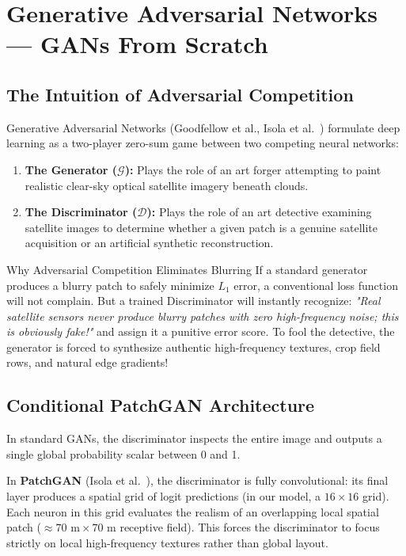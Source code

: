 \chapter{Generative Adversarial Networks --- GANs From Scratch}
\label{chap:ch13}

\section{The Intuition of Adversarial Competition}
Generative Adversarial Networks (Goodfellow et al., Isola et al.~\cite{isola2017pix2pix}) formulate deep learning as a two-player zero-sum game between two competing neural networks:
\begin{enumerate}
    \item \textbf{The Generator ($\mathcal{G}$):} Plays the role of an art forger attempting to paint realistic clear-sky optical satellite imagery beneath clouds.
    \item \textbf{The Discriminator ($\mathcal{D}$):} Plays the role of an art detective examining satellite images to determine whether a given patch is a genuine satellite acquisition or an artificial synthetic reconstruction.
\end{enumerate}

\begin{conceptbox}{Why Adversarial Competition Eliminates Blurring}
If a standard generator produces a blurry patch to safely minimize $L_1$ error, a conventional loss function will not complain. But a trained Discriminator will instantly recognize: \emph{"Real satellite sensors never produce blurry patches with zero high-frequency noise; this is obviously fake!"} and assign it a punitive error score. To fool the detective, the generator is forced to synthesize authentic high-frequency textures, crop field rows, and natural edge gradients!
\end{conceptbox}

\section{Conditional PatchGAN Architecture}
In standard GANs, the discriminator inspects the entire image and outputs a single global probability scalar between 0 and 1.

In \textbf{PatchGAN} (Isola et al.~\cite{isola2017pix2pix}), the discriminator is fully convolutional: its final layer produces a spatial grid of logit predictions (in our model, a $16 \times 16$ grid). Each neuron in this grid evaluates the realism of an overlapping local spatial patch ($\approx 70\text{ m} \times 70\text{ m}$ receptive field). This forces the discriminator to focus strictly on local high-frequency textures rather than global layout.

